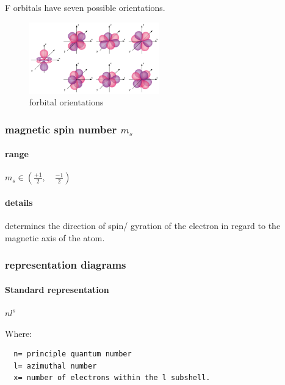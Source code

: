 \documentclass[]{article}
\let\oldparagraph\paragraph
\renewcommand{\paragraph}[1]{\oldparagraph{#1}\mbox{}}
\begin{document}
F orbitals have seven possible orientations.

\begin{figure}
\centering
\includegraphics[width=0.50000\textwidth]{Images/fOrbitalOrientations.png}
\caption{forbital orientations}
\end{figure}

\subsubsection{\texorpdfstring{magnetic spin number
\(m_{s}\)}{magnetic spin number m\_\{s\}}}\label{magnetic-spin-number-m_s}

\paragraph{range}\label{range-3}

\(m_{s} \in \left( \frac{+1}{2},\quad\frac{-1}{2} \right)\)

\paragraph{details}\label{details-3}

determines the direction of spin/ gyration of the electron in regard to
the magnetic axis of the atom.

\subsubsection{representation diagrams}\label{representation-diagrams}

\paragraph{Standard representation}\label{standard-representation}

\(nl^{s}\)

Where:

\begin{verbatim}
  n= principle quantum number
  l= azimuthal number
  x= number of electrons within the l subshell.      
\end{verbatim}
\end{document}
